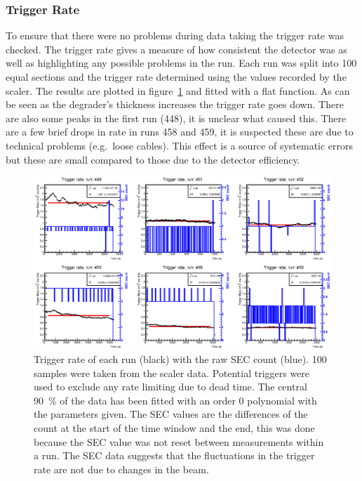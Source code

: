 \subsubsection{Trigger Rate} %
\label{sub:gain_stability}
To ensure that there were no problems during data taking the trigger rate was checked. The trigger rate gives a measure of how consistent the detector was as well as highlighting any possible problems in the run. Each run was split into 100 equal sections and the trigger rate determined using the values recorded by the scaler. The results are plotted in figure~\ref{fig:gain_stability} and fitted with a flat function. As can be seen as the degrader's thickness increases the trigger rate goes down. There are also some peaks in the first run (448), it is unclear what caused this. There are a few brief drops in rate in runs 458 and 459, it is suspected these are due to technical problems (e.g.\ loose cables). This effect is a source of systematic errors but these are small compared to those due to the detector efficiency.
%
\begin{figure}
      \centering
          \includegraphics[width=\textwidth]{images/momentum_spectrum/gain_stability.eps}
      \caption{Trigger rate of each run (black) with the raw SEC count (blue). 100 samples were taken from the scaler data. Potential triggers were used to exclude any rate limiting due to dead time. The central 90~\% of the data has been fitted with an order 0 polynomial with the parameters given. The SEC values are the differences of the count at the start of the time window and the end, this was done because the SEC value was not reset between measurements within a run. The SEC data suggests that the fluctuations in the trigger rate are not due to changes in the beam.}
      \label{fig:gain_stability}
\end{figure}

